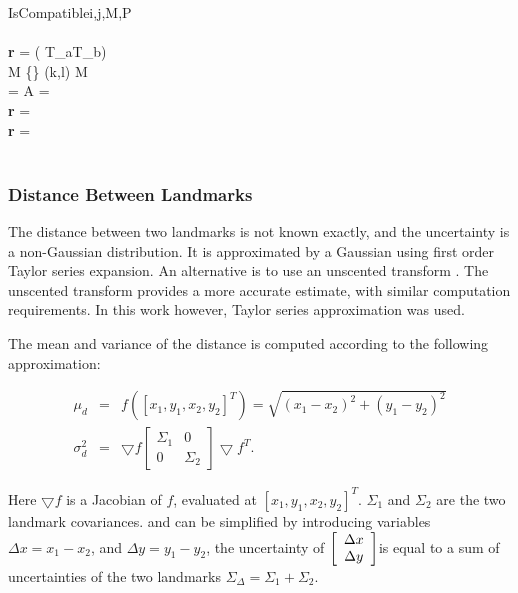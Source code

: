 \begin{pseudocode}{IsCompatible}{i,j,M,P}
  \\
  \\
  {\bf r} = \NOT \left( T_a\left[i\right] \OR T_b\left[j\right] \right)\\

   \AND M \ne \left\{\right\} \DO
  \BEGIN
     (k,l) \leftarrow M\\
     \left[E^a_{i,k}, E^b_{j,l}\right] = \TRUE \THEN
     \BEGIN
        A = \\
        {\bf r} = 
     \END\\
     \ELSE \BEGIN
        {\bf r} = \FALSE
     \END\\
  \END\\

\end{pseudocode}


\subsubsection{Distance Between Landmarks}

The distance between two landmarks is not known exactly, and the
uncertainty is a non-Gaussian distribution. It is approximated by a
Gaussian using first order Taylor series expansion. An alternative is to
use an unscented transform \cite{unscented}. The unscented transform
provides a more accurate estimate, with similar computation
requirements. In this work however, Taylor series approximation was
used.

The mean and variance of the distance is computed according to the
following approximation:

\begin{eqnarray}
  \mu_d  &=& f([x_1,y_1,x_2,y_2]^T) = \sqrt{(x_1-x_2)^2 + (y_1-y_2)^2}
\label{eqn:dist_estimate_mu}\\
 \sigma_{d}^2 &=& \bigtriangledown f \left [\begin {array}{cc} \Sigma_1 & 0\\
 0& \Sigma_2 \end{array}\right ] \bigtriangledown f^T.
\label{eqn:dist_estimate_cov}
\end{eqnarray}

Here $\bigtriangledown f$ is a Jacobian of $f$, evaluated at
$[x_1,y_1,x_2,y_2]^T$. $\Sigma_1$ and $\Sigma_2$ are the two landmark
covariances.  and
 can be simplified by introducing
variables $\Delta x = x_1 - x_2$, and $\Delta y = y_1 - y_2$, the
uncertainty of $\left[\begin{array}{c} \Delta x\\ \Delta y \end{array} \right]$is equal to a sum of
uncertainties of the two landmarks $\Sigma_\Delta = \Sigma_1 +
\Sigma_2$.

